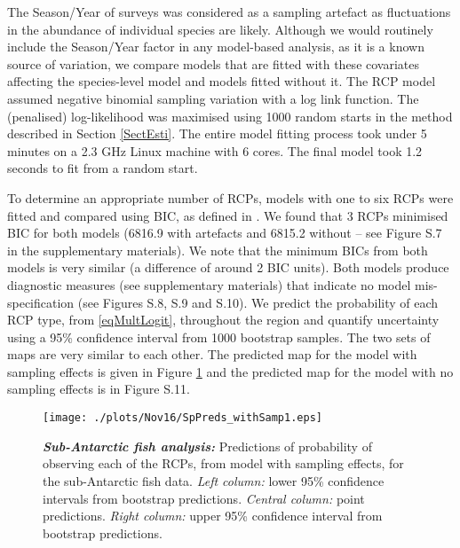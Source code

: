 \documentclass{statsoc}
\begin{document}
The Season/Year of surveys was considered as a sampling artefact as fluctuations in the abundance of individual species are likely. Although we would routinely include the Season/Year factor in any model-based analysis, as it is a known source of variation, we compare models that are fitted with these covariates affecting the species-level model and models fitted without it. The RCP model assumed negative binomial sampling variation with a log link function. The (penalised) log-likelihood was maximised using 1000 random starts in the method described in Section \ref{SectEsti}. The entire model fitting process took under 5 minutes on a 2.3 GHz Linux machine with 6 cores. The final model took 1.2 seconds to fit from a random start.

To determine an appropriate number of RCPs, models with one to six RCPs were fitted and compared using BIC, as defined in \citet{fos13}. We found that 3 RCPs minimised BIC for both models (6816.9 with artefacts and 6815.2 without -- see Figure S.7 in the supplementary materials). We note that the minimum BICs from both models is very similar (a difference of around 2 BIC units). Both models produce diagnostic measures (see supplementary materials) that indicate no model mis-specification (see Figures S.8, S.9 and S.10). We predict the probability of each RCP type, from \eqref{eqMultLogit}, throughout the region and quantify uncertainty using a 95\% confidence interval from 1000 bootstrap samples. The two sets of maps are very similar to each other. The predicted map for the model with sampling effects is given in Figure \ref{figKerguelenPreds1} and the predicted map for the model with no sampling effects is in Figure S.11.
\begin{figure}
 \centering
 \texttt{[image: ./plots/Nov16/SpPreds\_withSamp1.eps]}
 \caption{\label{figKerguelenPreds1}\textbf{\textit{Sub-Antarctic fish analysis:}} Predictions of probability of observing each of the RCPs, from model with sampling effects, for the sub-Antarctic fish data. \textit{Left column:} lower 95\% confidence intervals from bootstrap predictions. \textit{Central column:} point predictions. \textit{Right column:} upper 95\% confidence interval from bootstrap predictions.}
\end{figure}
\end{document}
